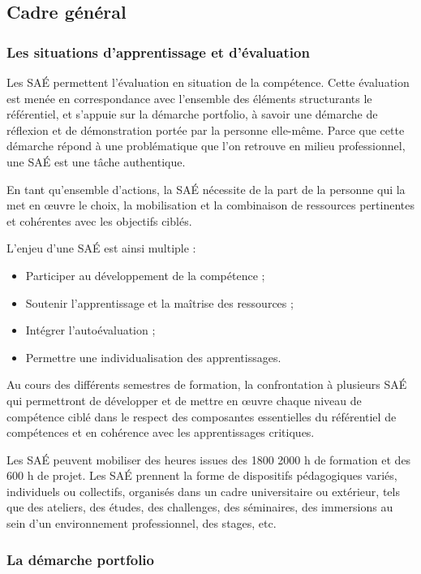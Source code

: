 \documentclass[10pt]{article}
\begin{document}
\newpage
\subsection{Cadre général}
\subsubsection*{Les situations d’apprentissage et d’évaluation}
Les SAÉ permettent l’évaluation en situation de la compétence. Cette
évaluation est menée en correspondance avec l’ensemble des éléments
structurants le référentiel, et s’appuie sur la démarche portfolio, à
savoir une démarche de réflexion et de démonstration portée par la
personne elle-même.  Parce que cette démarche répond à une problématique
que l’on retrouve en milieu professionnel, une SAÉ est une tâche
authentique.

En tant qu’ensemble d’actions, la SAÉ nécessite de la part de la
personne qui la met en œuvre le choix, la mobilisation et la combinaison
de ressources pertinentes et cohérentes avec les objectifs ciblés.

L’enjeu d’une SAÉ est ainsi multiple :
\begin{itemize}
\item Participer au développement de la compétence ;
\item Soutenir l’apprentissage et la maîtrise des ressources ;
\item Intégrer l’autoévaluation ;
\item Permettre une individualisation des apprentissages.
\end{itemize}

Au cours des différents semestres de formation, la confrontation à
plusieurs SAÉ qui permettront de développer et de mettre en œuvre
chaque niveau de compétence ciblé dans le respect des composantes
essentielles du référentiel de compétences et en cohérence avec les
apprentissages critiques.

Les SAÉ peuvent mobiliser des heures issues des
1800
2000
h de formation et des 600 h de projet. Les SAÉ prennent la forme de
dispositifs pédagogiques variés, individuels ou collectifs, organisés
dans un cadre universitaire ou extérieur, tels que des ateliers, des
études, des challenges, des séminaires, des immersions au sein d’un
environnement professionnel, des stages, etc.

\subsubsection*{La démarche portfolio}%
\label{FICHE-\VAR{portfolio.id|le}}%
\end{document}
